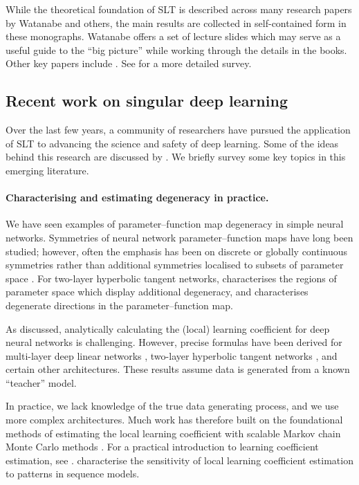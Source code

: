 \documentclass[11pt]{article}
\begin{document}
While the theoretical foundation of SLT is described across many research papers by Watanabe and others, the main results are collected in self-contained form in these monographs. Watanabe offers a set of lecture slides \citep{Watanabe2023} which may serve as a useful guide to the ``big picture'' while working through the details in the books.
Other key papers include \citet{Watanabe2007,Watanabe2013}. See \citet{Watanabe2024survey} for a more detailed survey.

\clearpage

\subsection{Recent work on singular deep learning}

Over the last few years, a community of researchers have pursued the application of SLT to advancing the science and safety of deep learning.
Some of the ideas behind this research are discussed by \citet{Hoogland+2023,Skalse+2023,PepinLehalleur+2025,Furman2026}.
We briefly survey some key topics in this emerging literature.

\paragraph{Characterising and estimating degeneracy in practice.}
We have seen examples of parameter--function map degeneracy in simple neural networks. Symmetries of neural network parameter--function maps have long been studied; however, often the emphasis has been on discrete or globally continuous symmetries rather than additional symmetries localised to subsets of parameter space \citep[see][\S 2.3, for a survey]{FarrugiaRoberts2022}.
For two-layer hyperbolic tangent networks, \citet{FarrugiaRoberts2024} characterises the regions of parameter space which display additional degeneracy, and \citet{FarrugiaRoberts2023} characterises degenerate directions in the parameter--function map.

As discussed, analytically calculating the (local) learning coefficient for deep neural networks is challenging. However, precise formulas have been derived for multi-layer deep linear networks \citep{Aoyagi+Watanabe2005,Aoyagi2024}, two-layer hyperbolic tangent networks \citep{Aoyagi2009}, and certain other architectures. These results assume data is generated from a known ``teacher'' model.

In practice, we lack knowledge of the true data generating process, and we use more complex architectures. Much work has therefore built on the foundational methods of estimating the local learning coefficient with scalable Markov chain Monte Carlo methods \citep{Lau+2025,Hitchcock+Hoogland2025}.
For a practical introduction to learning coefficient estimation, see \citet{Furman2023}.
\citet{Chen+Murfet2025} characterise the sensitivity of local learning coefficient estimation to patterns in sequence models.
\end{document}
